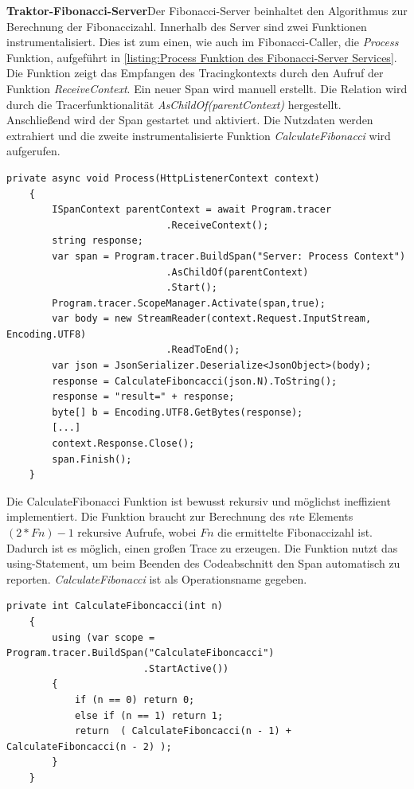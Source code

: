 \textbf{Traktor-Fibonacci-Server}\space\space\space Der Fibonacci-Server beinhaltet den Algorithmus zur Berechnung der Fibonaccizahl. 
Innerhalb des Server sind zwei Funktionen instrumentalisiert. Dies ist zum einen, wie auch im Fibonacci-Caller, die \emph{Process} Funktion, aufgeführt in \cref{listing:Process Funktion des Fibonacci-Server Services}. 
Die Funktion zeigt das Empfangen des Tracingkontexts durch den Aufruf der Funktion \emph{ReceiveContext}. Ein neuer Span wird manuell erstellt. 
Die Relation wird durch die Tracerfunktionalität \emph{AsChildOf(parentContext)} hergestellt. 
Anschließend wird der Span gestartet und aktiviert. 
Die Nutzdaten werden extrahiert und die zweite instrumentalisierte Funktion \emph{CalculateFibonacci} wird aufgerufen. 

\begin{minipage}[]{\textwidth}
	\begin{lstlisting}[frame=trBL]
	private async void Process(HttpListenerContext context)
	{
		ISpanContext parentContext = await Program.tracer
							.ReceiveContext();
		string response;
		var span = Program.tracer.BuildSpan("Server: Process Context")
							.AsChildOf(parentContext)
							.Start();
		Program.tracer.ScopeManager.Activate(span,true);
		var body = new StreamReader(context.Request.InputStream, Encoding.UTF8)
							.ReadToEnd();       
		var json = JsonSerializer.Deserialize<JsonObject>(body);
		response = CalculateFiboncacci(json.N).ToString();
		response = "result=" + response;
		byte[] b = Encoding.UTF8.GetBytes(response);
		[...]
		context.Response.Close();
		span.Finish();
	}
	\end{lstlisting}
	\label{listing:Process Funktion des Fibonacci-Server Services}
\end{minipage}

Die CalculateFibonacci Funktion ist bewusst rekursiv und möglichst ineffizient implementiert. Die Funktion braucht zur Berechnung des $n$te Elements $(2 * Fn) - 1$ rekursive Aufrufe, wobei $Fn$ die ermittelte Fibonaccizahl ist. Dadurch ist es möglich, einen großen Trace zu erzeugen. Die Funktion nutzt das using-Statement, um beim Beenden des Codeabschnitt den Span automatisch zu reporten. \emph{CalculateFibonacci} ist als Operationsname gegeben.

\begin{minipage}[]{\textwidth}
	\begin{lstlisting}[frame=trBL]
	private int CalculateFiboncacci(int n) 
	{
		using (var scope = Program.tracer.BuildSpan("CalculateFiboncacci")
						.StartActive())
		{
			if (n == 0) return 0;
			else if (n == 1) return 1;
			return  ( CalculateFiboncacci(n - 1) + CalculateFiboncacci(n - 2) );
		}
	}
	\end{lstlisting}
	\label{listing:Instrumentalisierte CalculateFibonacci Funktion des Fibonacci-Server Services}
\end{minipage}

